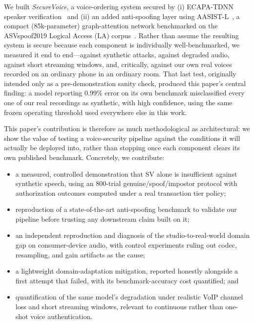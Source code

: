 \documentclass[conference]{IEEEtran}
\begin{document}
We built \textit{SecureVoice}, a voice-ordering system secured by (i)
ECAPA-TDNN speaker verification~\cite{desplanques2020ecapa} and (ii) an added
anti-spoofing layer using AASIST-L~\cite{jung2022aasist}, a compact
(85k-parameter) graph-attention network benchmarked on the ASVspoof2019 Logical
Access (LA) corpus~\cite{todisco2019asvspoof}. Rather than assume the resulting
system is secure because each component is individually well-benchmarked, we
measured it end to end---against synthetic attacks, against degraded audio,
against short streaming windows, and, critically, against our own real voices
recorded on an ordinary phone in an ordinary room. That last test, originally
intended only as a pre-demonstration sanity check, produced this paper's
central finding: a model reporting 0.99\% error on its own benchmark
misclassified every one of our real recordings as synthetic, with high
confidence, using the same frozen operating threshold used everywhere else in
this work.

This paper's contribution is therefore as much methodological as architectural:
we show the value of testing a voice-security pipeline against the conditions
it will actually be deployed into, rather than stopping once each component
clears its own published benchmark. Concretely, we contribute:

\begin{itemize}
\item a measured, controlled demonstration that SV alone is insufficient
      against synthetic speech, using an 800-trial genuine/spoof/impostor
      protocol with authorization outcomes computed under a real transaction
      tier policy;
\item reproduction of a state-of-the-art anti-spoofing benchmark to validate
      our pipeline before trusting any downstream claim built on it;
\item an independent reproduction and diagnosis of the studio-to-real-world
      domain gap on consumer-device audio, with control experiments ruling out
      codec, resampling, and gain artifacts as the cause;
\item a lightweight domain-adaptation mitigation, reported honestly alongside a
      first attempt that failed, with its benchmark-accuracy cost quantified;
      and
\item quantification of the same model's degradation under realistic VoIP
      channel loss and short streaming windows, relevant to continuous rather
      than one-shot voice authentication.
\end{itemize}
\end{document}

